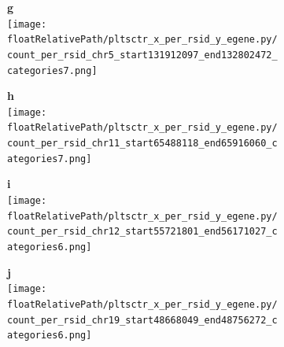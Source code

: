 \begin{figure}[!tbp]
%
\begin{subfigure}[]{.19\textwidth}
\textbf{g}
\\
\texttt{[image: \\floatRelativePath/pltsctr\_x\_per\_rsid\_y\_egene.py/count\_per\_rsid\_chr5\_start131912097\_end132802472\_categories7.png]}
\end{subfigure}
%
\begin{subfigure}[]{.19\textwidth}
\textbf{h}
\\
\texttt{[image: \\floatRelativePath/pltsctr\_x\_per\_rsid\_y\_egene.py/count\_per\_rsid\_chr11\_start65488118\_end65916060\_categories7.png]}
\end{subfigure}
%
\begin{subfigure}[]{.19\textwidth}
\textbf{i}
\\
\texttt{[image: \\floatRelativePath/pltsctr\_x\_per\_rsid\_y\_egene.py/count\_per\_rsid\_chr12\_start55721801\_end56171027\_categories6.png]}
\end{subfigure}
%
\begin{subfigure}[]{.19\textwidth}
\textbf{j}
\\
\texttt{[image: \\floatRelativePath/pltsctr\_x\_per\_rsid\_y\_egene.py/count\_per\_rsid\_chr19\_start48668049\_end48756272\_categories6.png]}
\end{subfigure}



\end{figure}
